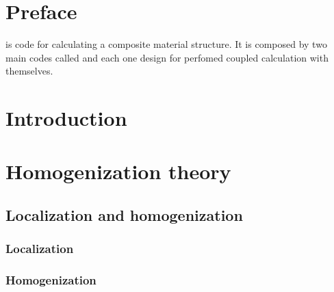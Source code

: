 \chapter{Preface}

\par
\sputnik is code for calculating a composite material structure. It is composed by two main codes called \macro and
\micro each one design for perfomed coupled calculation with themselves.

\chapter{Introduction}

\chapter{Homogenization theory}

\par
\section{Localization and homogenization}

\subsection{Localization}
\subsection{Homogenization}
\cite{hollister_1992}
\cite{suquet_1985}



